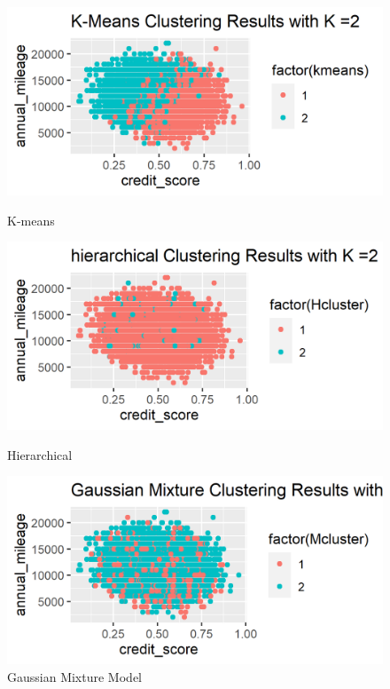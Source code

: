 \documentclass[a4paper, 11pt]{article}
\begin{document}
\begin{figure}[H]
	\centering
	\begin{minipage}[b]{.4\textwidth}
		\includegraphics[width=\textwidth]{figure6.png}
		\caption{K-means}
	\end{minipage}
 \hfill
	\begin{minipage}[b]{.4\textwidth}
	\includegraphics[width=\textwidth]{figure11.png}
	\caption{Hierarchical}
\end{minipage}
\hfill
\begin{minipage}[b]{.4\textwidth}
	\includegraphics[width=\textwidth]{figure12.png}
	\caption{Gaussian Mixture Model}
\end{minipage}

\end{figure}
\end{document}
